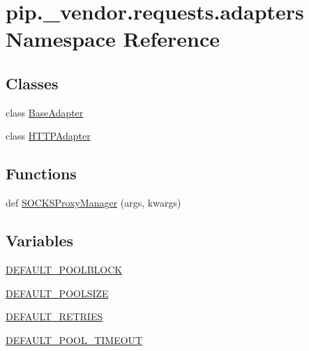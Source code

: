 \hypertarget{namespacepip_1_1__vendor_1_1requests_1_1adapters}{}\section{pip.\+\_\+vendor.\+requests.\+adapters Namespace Reference}
\label{namespacepip_1_1__vendor_1_1requests_1_1adapters}
\subsection*{Classes}
\begin{DoxyCompactItemize}
\item 
class \hyperlink{classpip_1_1__vendor_1_1requests_1_1adapters_1_1BaseAdapter}{Base\+Adapter}
\item 
class \hyperlink{classpip_1_1__vendor_1_1requests_1_1adapters_1_1HTTPAdapter}{H\+T\+T\+P\+Adapter}
\end{DoxyCompactItemize}
\subsection*{Functions}
\begin{DoxyCompactItemize}
\item 
def \hyperlink{namespacepip_1_1__vendor_1_1requests_1_1adapters_abadf59de86bfb018d4113f756951885d}{S\+O\+C\+K\+S\+Proxy\+Manager} (args, kwargs)
\end{DoxyCompactItemize}
\subsection*{Variables}
\begin{DoxyCompactItemize}
\item 
\hyperlink{namespacepip_1_1__vendor_1_1requests_1_1adapters_a1a319251a1ddc3b53aa48239822097c1}{D\+E\+F\+A\+U\+L\+T\+\_\+\+P\+O\+O\+L\+B\+L\+O\+CK}
\item 
\hyperlink{namespacepip_1_1__vendor_1_1requests_1_1adapters_af8e5fcb6cae7c37dd1f744e907414583}{D\+E\+F\+A\+U\+L\+T\+\_\+\+P\+O\+O\+L\+S\+I\+ZE}
\item 
\hyperlink{namespacepip_1_1__vendor_1_1requests_1_1adapters_a1dc93197b7ccf57f9152a304c699a8e0}{D\+E\+F\+A\+U\+L\+T\+\_\+\+R\+E\+T\+R\+I\+ES}
\item 
\hyperlink{namespacepip_1_1__vendor_1_1requests_1_1adapters_aa2c62b416e319ab9b2146f7e9dd36ff6}{D\+E\+F\+A\+U\+L\+T\+\_\+\+P\+O\+O\+L\+\_\+\+T\+I\+M\+E\+O\+UT}
\end{DoxyCompactItemize}


